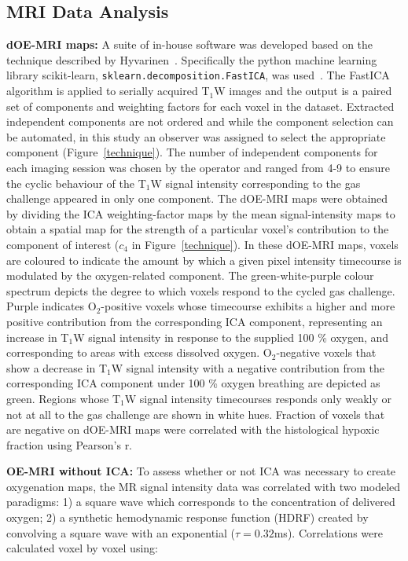 \subsection{MRI Data Analysis}
\label{doemri_mrianalysis2}
\textbf{dOE-MRI maps:} A suite of in-house software was developed based on the technique described by Hyvarinen~\cite{Hyvarinen:2000vk}.
Specifically the python machine learning library scikit-learn, \texttt{sklearn.decomposition.FastICA}, was used~\cite{Pedregosa:2011tv}.
The Fast\acs{ICA} algorithm is applied to serially acquired T$_1$W images and the output is a paired set of components and weighting factors for each voxel in the dataset.
Extracted independent components are not ordered and while the component selection can be automated, in this study an observer was assigned to select the appropriate component (Figure~\ref{technique}).
The number of independent components for each imaging session was chosen by the operator and ranged from 4-9 to ensure the cyclic behaviour of the T$_1$W signal intensity corresponding to the gas challenge appeared in only one component. 
The \acs{dOE-MRI} maps were obtained by dividing the \acs{ICA} weighting-factor maps by the mean signal-intensity maps to obtain a spatial map for the strength of a particular voxel's contribution to the component of interest ($c_4$ in Figure~\ref{technique}).
In these \acs{dOE-MRI} maps, voxels are coloured to indicate the amount by which a given pixel intensity timecourse is modulated by the oxygen-related component.  
The green-white-purple colour spectrum depicts the degree to which voxels respond to the cycled gas challenge.
Purple indicates O$_2$-positive voxels whose timecourse exhibits a higher and more positive contribution from the corresponding \acs{ICA} component, representing an increase in T$_1$W signal intensity in response to the supplied 100 \% oxygen, and corresponding to areas with excess dissolved oxygen. 
O$_2$-negative voxels that show a decrease in T$_1$W signal intensity with a negative contribution from the corresponding \acs{ICA} component under 100 \% oxygen breathing are depicted as green. 
Regions whose T$_1$W signal intensity timecourses responds only weakly or not at all to the gas challenge are shown in white hues.
Fraction of voxels that are negative on \acs{dOE-MRI} maps were correlated with the histological hypoxic fraction using Pearson's r.

\noindent\textbf{OE-MRI without \acs{ICA}:} To assess whether or not \acs{ICA} was necessary to create oxygenation maps, the MR signal intensity data was correlated with two modeled paradigms: 1) a square wave which corresponds to the concentration of delivered oxygen; 2) a synthetic hemodynamic response function (HDRF) created by convolving a square wave with an exponential ($\tau=0.32$ms).
Correlations were calculated voxel by voxel using:

